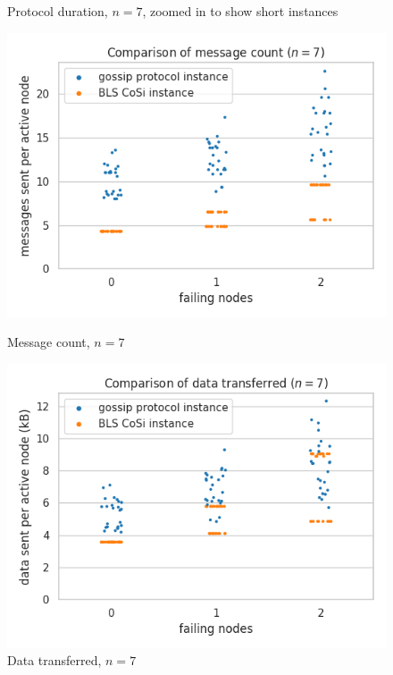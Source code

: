 \begin{figure}[H]
\begin{minipage}{0.5\textwidth}
        \captionsetup{labelformat=empty}
        \caption{Protocol duration, $n = 7$, zoomed in to show short instances}
    \end{minipage}\hfill
\end{figure}

\begin{figure}[H]
    \centering
    \begin{minipage}{0.5\textwidth}
        \centering
        \includegraphics[width=\textwidth]{figures/1/bandwidth_msg_tx_sum_7.png}
        \captionsetup{labelformat=empty}
        \caption{Message count, $n = 7$}
    \end{minipage}\hfill
    \begin{minipage}{0.5\textwidth}
        \centering
        \includegraphics[width=\textwidth]{figures/1/bandwidth_tx_sum_7.png}
        \captionsetup{labelformat=empty}
        \caption{Data transferred, $n = 7$}
    \end{minipage}\hfill
\end{figure}

